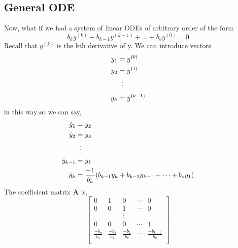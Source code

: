 \documentclass{article}
\newcommand{\be}{\begin{equation}}
\newcommand{\ee}{\end{equation}}
\begin{document}
\subsection{General ODE}
Now, what if we had a system of linear ODEs of arbitrary order of the form
\be
  b_k y^{(k)} + b_{k-1} y^{(k-1)} + \dots + b_o y^{(0)} = 0
\ee
Recall that $y^{(k)}$ is the kth derivative of y.
We can introduce vectors
\begin{align}
    y_1 &= y^{(0)} \\
    y_2 &= y^{(1)} \\
    & \vdotswithin{ = }\notag \\
    y_k &= y^{(k-1)} \\
\end{align}
in this way so we can say,
\begin{align}
    \dot{y}_1 &= y_2 \\
    \dot{y}_2 &= y_3 \\
    & \vdotswithin{ = }\notag \\
    \dot{y}_{k-1} &= y_k \\
    \dot{y}_k &= \frac{-1}{b_k} (b_{k-1} y_k + b_{k-2} y_{k-1} + \dots + b_o y_1) \\
\end{align}
The coefficient matrix \textbf{A} is,
\be
  \begin{bmatrix}
    0 & 1 & 0 & \cdots & 0 \\
    0 & 0 & 1 & \cdots & 0 \\
     & & \vdots & & \\
    0 & 0 & 0 & \cdots & 1 \\
    \frac{-b_o}{b_k} & \frac{-b_1}{b_k} & \frac{-b_2}{b_k} & \cdots & \frac{-b_{k-1}}{b_k} \\
  \end{bmatrix}
\ee
\end{document}
